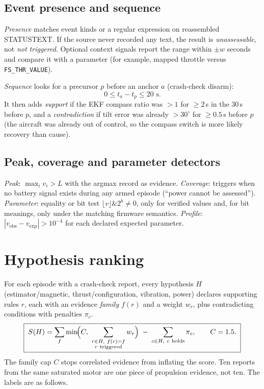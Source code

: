 \documentclass[11pt,a4paper]{article}
\newcommand{\code}[1]{\texttt{#1}}
\begin{document}
\subsection{Event presence and sequence}
\emph{Presence} matches event kinds or a regular expression on reassembled STATUSTEXT. If the
source never recorded any text, the result is \emph{unassessable}, not \emph{not triggered}.
Optional context signals report the range within $\pm w$ seconds and compare it with a parameter
(for example, mapped throttle versus \code{FS\_THR\_VALUE}).

\emph{Sequence} looks for a precursor $p$ before an anchor $a$ (crash-check disarm):
\[
0\le t_a-t_p\le 20\text{ s}.
\]
It then adds \emph{support} if the EKF compass ratio was $>1$ for $\ge2$\,s in the 30\,s before
$p$, and a \emph{contradiction} if tilt error was already $>30^\circ$ for $\ge0.5$\,s before $p$
(the aircraft was already out of control, so the compass switch is more likely recovery than cause).

\subsection{Peak, coverage and parameter detectors}
\emph{Peak}: $\max_i v_i > L$ with the argmax record as evidence. \emph{Coverage}: triggers when no
battery signal exists during any armed episode (``power cannot be assessed''). \emph{Parameter}:
equality or bit test $\lfloor v\rfloor \mathbin{\&} 2^b\ne0$, only for verified values and, for
bit meanings, only under the matching firmware semantics. \emph{Profile}: $|v_{\text{obs}}-v_{\text{exp}}|
>10^{-4}$ for each declared expected parameter.

\section{Hypothesis ranking}\label{sec:hyp}

For each episode with a crash-check report, every hypothesis $H$ (estimator/magnetic,
thrust/configuration, vibration, power) declares supporting rules $r$, each with an evidence
\emph{family} $f(r)$ and a weight $w_r$, plus contradicting conditions with penalties $\pi_c$.
\[
\boxed{\;
S(H)=\sum_{f}\min\!\Bigl(C,\ \sum_{\substack{r\in H,\ f(r)=f\\ r\ \text{triggered}}} w_r\Bigr)
\;-\;\sum_{c\in H,\ c\ \text{holds}}\pi_c,\qquad C=1.5 .\;}
\]
The family cap $C$ stops correlated evidence from inflating the score. Ten reports from the same
saturated motor are one piece of propulsion evidence, not ten. The labels are as follows.
\end{document}
